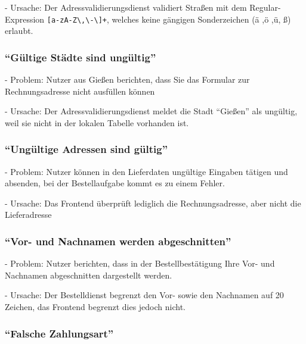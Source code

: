 - Ursache: Der Adressvalidierungsdienst validiert Straßen mit dem Regular-Expression \texttt{[a-zA-Z\textbackslash,\textbackslash-\textbackslash ]+}, welches keine gängigen Sonderzeichen (ä ,ö ,ü, ß) erlaubt.

%
%

\subsubsection{\enquote{Gültige Städte sind ungültig}}

- Problem: Nutzer aus Gießen berichten, dass Sie das Formular zur Rechnungsadresse nicht ausfüllen können

- Ursache: Der Adressvalidierungsdienst meldet die Stadt \enquote{Gießen} als ungültig, weil sie nicht in der lokalen Tabelle vorhanden ist.

\subsubsection{\enquote{Ungültige Adressen sind gültig}}
\label{sec:invalid-address-is-valid}

- Problem: Nutzer können in den Lieferdaten ungültige Eingaben tätigen und absenden, bei der Bestellaufgabe kommt es zu einem Fehler.

- Ursache: Das Frontend überprüft lediglich die Rechnungsadresse, aber nicht die Lieferadresse

\subsubsection{\enquote{Vor- und Nachnamen werden abgeschnitten}}

- Problem: Nutzer berichten, dass in der Bestellbestätigung Ihre Vor- und Nachnamen abgeschnitten dargestellt werden.

- Ursache: Der Bestelldienst begrenzt den Vor- sowie den Nachnamen auf 20 Zeichen, das Frontend begrenzt dies jedoch nicht.

\subsubsection{\enquote{Falsche Zahlungsart}}

